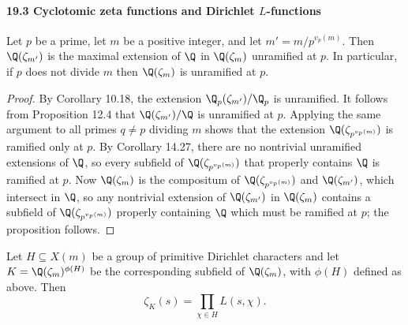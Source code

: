 \paragraph{19.3 Cyclotomic zeta functions and Dirichlet $L$-functions}
\begin{proposition}[19.14]
Let $p$ be a prime, let $m$ be a positive integer, and let $m'=m/p^{v_p(m)}$. Then $\Q(\zeta_{m'})$ is the maximal extension of $\Q$ in $\Q(\zeta_m)$ unramified at $p$. In particular, if $p$ does not divide $m$ then $\Q(\zeta_m)$ is unramified at $p$.
\end{proposition}
\begin{proof}
By Corollary 10.18, the extension $\Q_p(\zeta_{m'})/\Q_p$ is unramified. It follows from Proposition 12.4 that $\Q(\zeta_{m'})/\Q$ is unramified at $p$. Applying the same argument to all primes $q\ne p$ dividing $m$ shows that the extension $\Q(\zeta_{p^{v_p(m)}})$ is ramified only at $p$. By Corollary 14.27, there are no nontrivial unramified extensions of $\Q$, so every subfield of $\Q(\zeta_{p^{v_p(m)}})$ that properly contains $\Q$ is ramified at $p$. Now $\Q(\zeta_m)$ is the compositum of $\Q(\zeta_{p^{v_p(m)}})$ and $\Q(\zeta_{m'})$, which intersect in $\Q$, so any nontrivial extension of $\Q(\zeta_{m'})$ in $\Q(\zeta_m)$ contains a subfield of $\Q(\zeta_{p^{v_p(m)}})$ properly containing $\Q$ which must be ramified at $p$; the proposition follows.
\end{proof}
\begin{theorem}[19.15]
Let $H\subseteq X(m)$ be a group of primitive Dirichlet characters and let $K=\Q(\zeta_m)^{\phi(H)}$ be the corresponding subfield of $\Q(\zeta_m)$, with $\phi(H)$ defined as above. Then
\[
\zeta_K(s)=\prod_{\chi\in H}L(s,\chi).
\]
\end{theorem}
